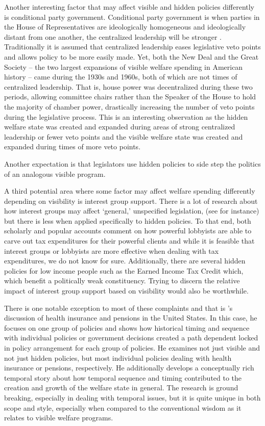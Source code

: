 \documentclass[12pt]{article}
\begin{document}
Another interesting factor that may affect visible and hidden policies differently is conditional party government. Conditional party government is when parties in the House of Representatives are ideologically homogeneous and ideologically distant from one another, the centralized leadership will be stronger \cite{rohde1991}. Traditionally it is assumed that centralized leadership eases legislative veto points and allows policy to be more easily made. Yet, both the New Deal and the Great Society -- the two largest expansions of visible welfare spending in American history -- came during the 1930s and 1960s, both of which are not times of centralized leadership. That is, house power was decentralized during these two periods, allowing committee chairs rather than the Speaker of the House to hold the majority of chamber power, drastically increasing the number of veto points during the legislative process. This is an interesting observation as the hidden welfare state was created and expanded during areas of strong centralized leadership or fewer veto points and the visible welfare state was created and expanded during times of more veto points.

Another expectation is that legislators use hidden policies to side step the politics of an analogous visible program.

A third potential area where some factor may affect welfare spending differently depending on visibility is interest group support. There is a lot of research about how interest groups may affect `general,' unspecified legislation, (see \citealt{hall2006} for instance) but there is less when applied specifically to hidden policies. To that end, both scholarly and popular accounts comment on how powerful lobbyists are able to carve out tax expenditures for their  powerful clients \citep{hacker2011, leibovich2013} and while it is feasible that interest groups or lobbyists are more effective when dealing with tax expenditures, we do not know for sure. Additionally, there are several hidden policies for low income people such as the Earned Income Tax Credit which, which benefit a politically weak constituency. Trying to discern the relative impact of interest group support based on visibility would also be worthwhile.

There is one notable exception to most of these complaints and that is \citet{hacker2002}'s discussion of health insurance and pensions in the United States. In this case, he focuses on one group of policies and shows how historical timing and sequence with individual policies or government decisions created a path dependent locked in policy arrangement for each group of policies. He examines not just visible and not just hidden policies, but most individual policies dealing with health insurance or pensions, respectively. He additionally develops a conceptually rich temporal story about how temporal sequence and timing contributed to the creation and growth of the welfare state in general. The \cite{hacker2002} research is ground breaking, especially in dealing with temporal issues, but it is quite unique in both scope and style, especially when compared to the conventional wisdom as it relates to visible welfare programs.
\end{document}
